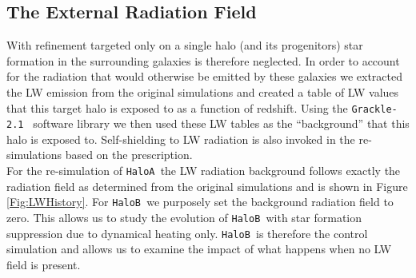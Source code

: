 \documentclass[graphics, twocolumn, usenatbib]{mn2e}
\newcommand{\grackle}{\texttt{Grackle-2.1~}}
\newcommand{\ha} {\texttt{HaloA~}}
\newcommand{\hb} {\texttt{HaloB~}}
\begin{document}
 \subsection{The External Radiation Field} \label{Sec:LWRadField}
 With refinement targeted only on a single halo (and its progenitors) star formation in the
 surrounding galaxies is therefore neglected. In order to account for the radiation that would
 otherwise be emitted by these galaxies we extracted the LW emission from the original simulations
 and created a table of LW values that this target halo is exposed to as a function of
 redshift. Using the \grackle \citep{Grackle} software library we then used these LW tables as
 the ``background'' that this halo is exposed to. Self-shielding to LW radiation is also invoked in
 the re-simulations based on the \cite{Wolcott-Green_2011} prescription.\\
 \indent For the re-simulation of \ha the LW radiation background follows exactly the radiation
 field as determined from the original simulations and is shown in Figure \ref{Fig:LWHistory}.
 For \hb we purposely set the background radiation field to zero. This allows us to study the
 evolution of \hb with star formation suppression due to dynamical heating only. \hb is therefore
 the control simulation and allows us to examine the impact of what happens when
 no LW field is present. 
 
\end{document}
